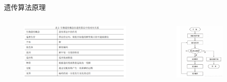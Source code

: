 \documentclass[xcolor=table,dvipsnames,svgnames,aspectratio=169,fontset=ubuntu]{ctexbeamer}
\begin{document}
\begin{frame}{遗传算法原理}
  \begin{columns}
    \begin{figure}
      \centering
      \includegraphics[width=\textwidth]{遗传算法对应.png}
    \end{figure}
    \begin{figure}
      \centering
      \includegraphics[width=0.8\textwidth]{遗传算法.png}
    \end{figure}
    \end{columns}
\end{frame}
\end{document}
